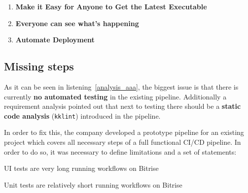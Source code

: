 \begin{enumerate}
	\item \textbf{Make it Easy for Anyone to Get the Latest Executable}

	\item \textbf{Everyone can see what's happening}

	\item \textbf{Automate Deployment}

\end{enumerate}

\subsection{Missing steps}
As it can be seen in listening~\ref{analysis_aaa}, the biggest issue is that there is currently \textbf{no automated testing} in the existing pipeline. Additionally a requirement analysis pointed out that next to testing there should be a \textbf{static code analysis} (\texttt{kklint}) introduced in the pipeline.

In order to fix this, the company developed a prototype pipeline for an existing project which covers all necessary steps of a full functional CI/CD pipeline. In order to do so, it was necessary to define limitations and a set of statements:\\

\begin{statement}\label{stat:long_ui}
	UI tests are very long running workflows on Bitrise
\end{statement}

\begin{statement}\label{stat:short_unit}
	Unit tests are relatively short running workflows on Bitrise
\end{statement}

